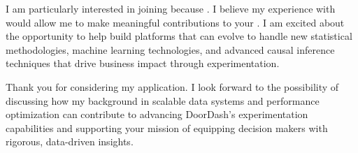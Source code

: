 I am particularly interested in joining \COMPANY{} because \SPECIFICREASON. I believe my experience with \RELEVANTTECHNOLOGY{} would allow me to make meaningful contributions to your \TEAMNAME. I am excited about the opportunity to help build platforms that can evolve to handle new statistical methodologies, machine learning technologies, and advanced causal inference techniques that drive business impact through experimentation.

Thank you for considering my application. I look forward to the possibility of discussing how my background in scalable data systems and performance optimization can contribute to advancing DoorDash's experimentation capabilities and supporting your mission of equipping decision makers with rigorous, data-driven insights.